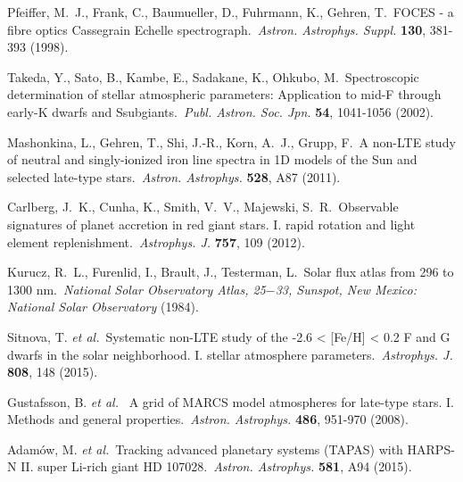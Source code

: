 \documentclass[twoside,onecolumnm,12pt]{article}
\begin{document}
\footnotesize
\begin{thebibliography}{99}
\makeatletter
\addtocounter{\@listctr}{30}
\makeatother

 Pfeiffer, M.~J., Frank, C., Baumueller, D., Fuhrmann, K., Gehren, T.\ FOCES - a fibre optics Cassegrain Echelle spectrograph.\ \emph{Astron. Astrophys. Suppl.} \textbf{130}, 381-393 (1998). %

 Takeda, Y., Sato, B., Kambe, E., Sadakane, K., Ohkubo, M.\ Spectroscopic determination of stellar atmospheric parameters: Application to mid-F through early-K dwarfs and Ssubgiants.\ \emph{Publ. Astron. Soc. Jpn.} \textbf{54}, 1041-1056 (2002). %

 Mashonkina, L., Gehren, T., Shi, J.-R., Korn, A.~J., Grupp, F.\ A non-LTE study of neutral and singly-ionized iron line spectra in 1D models of the Sun and selected late-type stars.\ \emph{Astron. Astrophys.} \textbf{528}, A87 (2011). %

 Carlberg, J.~K., Cunha, K., Smith, V.~V., Majewski, S.~R.\ Observable signatures of planet accretion in red giant stars. I. rapid rotation and light element replenishment.\ \emph{Astrophys. J.} \textbf{757}, 109 (2012). %

 Kurucz, R.~L., Furenlid, I., Brault, J., Testerman, L.\ Solar flux atlas from 296 to 1300 nm.\ \emph{National Solar Observatory Atlas, 25$-$33, Sunspot, New Mexico: National Solar Observatory} (1984). %

 Sitnova, T. \emph{et al.}\ Systematic non-LTE study of the -2.6 < [Fe/H] < 0.2 F and G dwarfs in the solar neighborhood. I. stellar atmosphere parameters.\ \emph{Astrophys. J.} \textbf{808}, 148 (2015). %

 Gustafsson, B. \emph{et al.} \ A grid of MARCS model atmospheres for late-type stars. I. Methods and general properties.\ \emph{Astron. Astrophys.} \textbf{486}, 951-970 (2008). %

 Adam{\'o}w, M. \emph{et al.}\ Tracking advanced planetary systems (TAPAS) with HARPS-N II. super Li-rich giant HD 107028.\ \emph{Astron. Astrophys.} \textbf{581}, A94 (2015). %


\end{thebibliography}
\end{document}

